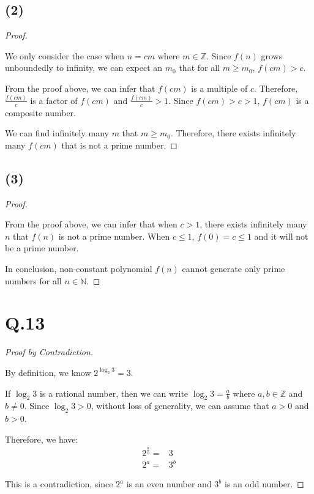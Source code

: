 \documentclass[a4paper,12pt]{article}
\begin{document}
\subsection*{(2)}

\begin{proof}
$ $

We only consider the case when $n = cm$ where $m \in \mathbb{Z}$.
Since $f(n)$ grows unboundedly to infinity, we can expect an $m_0$ that for all $m \geq m_0$, $f(cm) > c$.

From the proof above, we can infer that $f(cm)$ is a multiple of $c$.
Therefore, $\frac{f(cm)}{c}$ is a factor of $f(cm)$ and $\frac{f(cm)}{c} > 1$.
Since $f(cm) > c > 1$, $f(cm)$ is a composite number.

We can find infinitely many $m$ that $m \geq m_0$.
Therefore, there exists infinitely many $f(cm)$ that is not a prime number.
\end{proof}

\subsection*{(3)}

\begin{proof}
$ $

From the proof above, we can infer that when $c > 1$, there exists infinitely many $n$ that $f(n)$ is not a prime number.
When $c \leq 1$, $f(0) = c \leq 1$ and it will not be a prime number.

In conclusion, non-constant polynomial $f(n)$ cannot generate only prime numbers for all $n \in \mathbb{N}$.
\end{proof}

\newpage
\section*{Q.13}

\begin{proof}[Proof by Contradiction]
$ $

By definition, we know $2^{\log_2 3} = 3$.

If $\log_2 3$ is a rational number, then we can write $\log_2 3 = \frac{a}{b}$ where $a,b \in \mathbb{Z}$ and $b \ne 0$.
Since $\log_2 3 > 0$, without loss of generality, we can assume that $a > 0$ and $b > 0$.

Therefore, we have:
\begin{align*}
	2^{\frac{a}{b}} =& 3 \\
	2^a =& 3^b
\end{align*}

This is a contradiction, since $2^a$ is an even number and $3^b$ is an odd number.
\end{proof}
\end{document}
